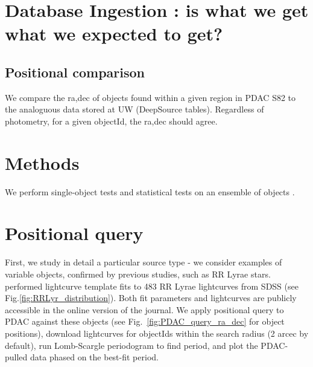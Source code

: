 \documentclass[fleqn,usenatbib]{mnras} %
\begin{document}
\section{Database Ingestion : is what we get what we expected to get? }
\label{sec:dg}


\subsection{Positional comparison }

We compare the ra,dec of objects found within  a given region in PDAC S82 to the analoguous data stored at UW (DeepSource tables). Regardless of photometry, for a given objectId, the ra,dec should agree.  




\section{Methods}

We perform single-object tests and statistical tests on an ensemble of objects . 



\section{Positional query}
First, we study in detail a particular source type - we consider examples of variable objects, confirmed by previous studies, such as RR Lyrae stars. \cite{sesar2010}  performed lightcurve template fits to 483 RR Lyrae lightcurves from SDSS (see Fig.\ref{fig:RRLyr_distribution}). Both fit parameters and lightcurves are publicly accessible in the online version of the journal. We apply positional  query to PDAC against these objects (see Fig.~\ref{fig:PDAC_query_ra_dec} for object positions), download lightcurves for objectIds  within the search radius (2 arcec by default), run Lomb-Scargle periodogram to find period, and plot the PDAC-pulled data phased on the best-fit period. 
\end{document}
